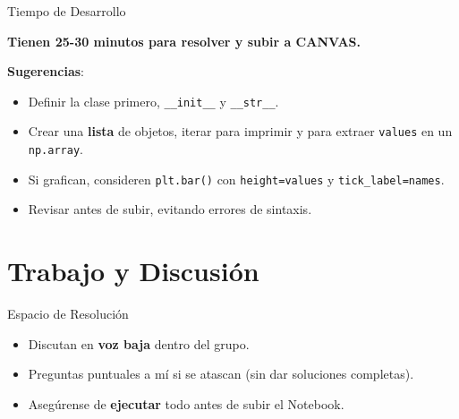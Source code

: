 \documentclass[10pt]{beamer}
\begin{document}
\begin{frame}{Tiempo de Desarrollo}
  \begin{block}{}
    \huge{\textbf{Tienen 25-30 minutos para resolver y subir a CANVAS.}}
  \end{block}
  \vspace{0.3cm}
  \textbf{Sugerencias}:
  \begin{itemize}
    \item Definir la clase primero, \texttt{\_\_init\_\_} y \texttt{\_\_str\_\_}.
    \item Crear una \textbf{lista} de objetos, iterar para imprimir y para extraer \texttt{values} en un \texttt{np.array}.
    \item Si grafican, consideren \texttt{plt.bar()} con \texttt{height=values} y \texttt{tick\_label=names}.
    \item Revisar antes de subir, evitando errores de sintaxis.
  \end{itemize}
\end{frame}

\section{Trabajo y Discusión}

\begin{frame}{Espacio de Resolución}
  \begin{itemize}
    \item Discutan en \textbf{voz baja} dentro del grupo.
    \item Preguntas puntuales a mí si se atascan (sin dar soluciones completas).
    \item Asegúrense de \textbf{ejecutar} todo antes de subir el Notebook.
  \end{itemize}
\end{frame}
\end{document}
